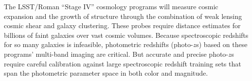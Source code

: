 \documentclass[oneside,11pt]{amsart}
\DeclareRobustCommand{\gtrsim}{%
\mathrel{\hskip-.5em\begin{array}{c}>\\[-8pt]\sim\end{array}\hskip-.5em}}
\begin{document}



The LSST/Roman ``Stage IV'' cosmology programs will measure cosmic expansion and the growth of structure through the combination of weak lensing cosmic shear and galaxy clustering.  These probes require distance estimates for billions of faint galaxies over vast cosmic volumes.  Because spectroscopic redshifts for so many galaxies is infeasible, photometric redshifts (photo-$z$s) based on these programs' multi-band imaging are critical.  But accurate and precise photo-$z$s require careful calibration against large spectroscopic redshift training sets that span the photometric parameter space in both color and magnitude.  
\end{document}
